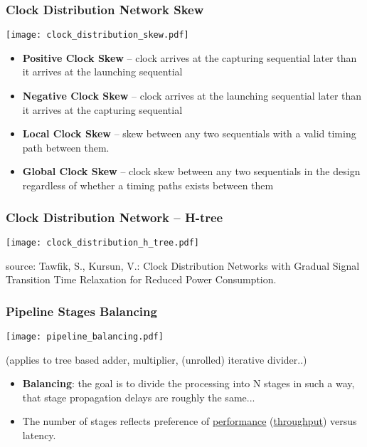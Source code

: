 \documentclass{beamer}
\begin{document}
\begin{frame}
\frametitle{Clock Distribution Network Skew}
\texttt{[image: clock\_distribution\_skew.pdf]}

\begin{itemize}
 \item \textbf{Positive Clock Skew} -- clock arrives at the capturing sequential later than it arrives at the launching sequential
 \item \textbf{Negative Clock Skew} -- clock arrives at the launching sequential later than it arrives at the capturing sequential
 \item \textbf{Local Clock Skew} -- skew between any two sequentials with a valid timing path between them.
 \item \textbf{Global Clock Skew} -- clock skew between any two sequentials in the design regardless of whether a timing paths exists between them
\end{itemize}

\end{frame}

\begin{frame}
\frametitle{Clock Distribution Network -- H-tree}

{
\centering
\texttt{[image: clock\_distribution\_h\_tree.pdf]}
}

\vskip 2mm

source: Tawfik, S., Kursun, V.: Clock Distribution Networks with Gradual Signal Transition Time Relaxation for Reduced Power Consumption.

\end{frame}

\begin{frame}
\frametitle{Pipeline Stages Balancing}
\texttt{[image: pipeline\_balancing.pdf]}

(applies to tree based adder, multiplier, (unrolled) iterative divider..)

\begin{itemize}
 \item \textbf{Balancing}: the goal is to divide the processing into N stages in such a way, that stage propagation delays are roughly the same...
 \item The number of stages reflects preference of \underline{performance} (\underline{throughput}) versus latency.
\end{itemize}

\end{frame}
\end{document}
